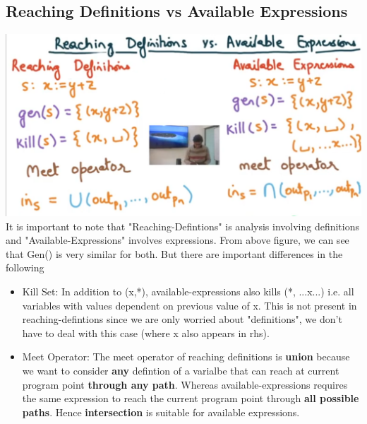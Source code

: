 \subsection{Reaching Definitions vs Available Expressions}
\includegraphics[scale=0.3]{images/90_2.png}
It is important to note that "Reaching-Defintions" is analysis involving definitions and "Available-Expressions" involves expressions.
From above figure, we can see that Gen() is very similar for both. But there are important differences in the following 
\begin{itemize}
    \item Kill Set: In addition to (x,*), available-expressions also kills (*, ...x...) i.e. all variables with values dependent on previous value of x. This is not present in reaching-defintions since we are only worried about "definitions", we don't have to deal with this case (where x also appears in rhs). 
    \item Meet Operator: The meet operator of reaching definitions is \textbf{union} because we want to consider \textbf{any} defintion of a varialbe that can reach at current program point \textbf{through any path}. 
    Whereas available-expressions requires the same expression to reach the current program point through \textbf{all possible paths}. Hence \textbf{intersection} is suitable for available expressions. 
\end{itemize}